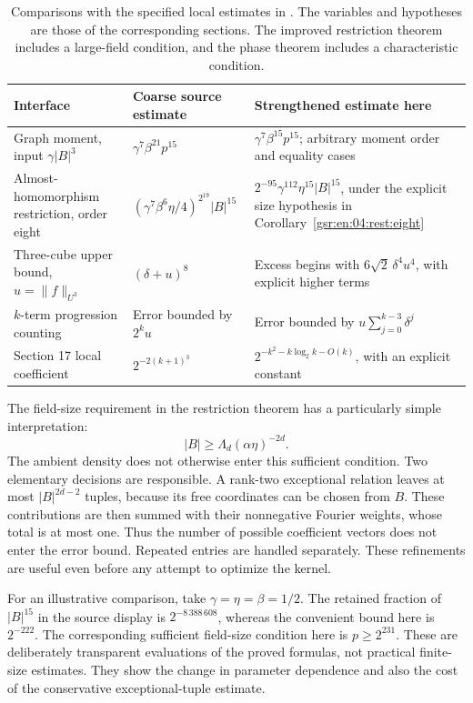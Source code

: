 \documentclass[11pt,letterpaper]{article}
\numberwithin{equation}{section}
\theoremstyle{definition}
\theoremstyle{remark}
\newcommand{\1}{\mathbf 1}
\begin{document}
\begin{table}[htbp]
\centering
\small
\renewcommand{\arraystretch}{1.25}
\begin{tabularx}{\textwidth}{@{}>{\raggedright\arraybackslash}p{}>{\raggedright\arraybackslash}X>{\raggedright\arraybackslash}X@{}}
\toprule
Interface & Coarse source estimate & Strengthened estimate here\\
\midrule
Graph moment, input \(\gamma|B|^3\)
& \(\gamma^7\beta^{21}p^{15}\)
& \(\gamma^7\beta^{15}p^{15}\); arbitrary moment order and equality cases\\
Almost-homomorphism restriction, order eight
& \((\gamma^7\beta^6\eta/4)^{2^{19}}|B|^{15}\)
& \(2^{-95}\gamma^{112}\eta^{15}|B|^{15}\), under the explicit size hypothesis in Corollary~\ref{gsr:en:04:rest:eight}\\
Three-cube upper bound, \(u=\|f\|_{U^3}\)
& \((\delta+u)^8\)
& Excess begins with \(6\sqrt2\,\delta^4u^4\), with explicit higher terms\\
\(k\)-term progression counting
& Error bounded by \(2^k u\)
& Error bounded by \(u\sum_{j=0}^{k-3}\delta^j\)\\
Section 17 local coefficient
& \(2^{-2(k+1)^3}\)
& \(2^{-k^2-k\log_2 k-O(k)}\), with an explicit constant\\
\bottomrule
\end{tabularx}
\caption{Comparisons with the specified local estimates in
\cite{gowers,repo04}.  The variables and hypotheses are those of the
corresponding sections.  The improved restriction theorem includes a
large-field condition, and the phase theorem includes a characteristic
condition.}
\label{gsr:fz:04:tab:comparisons}
\end{table}

The field-size requirement in the restriction theorem has a particularly
simple interpretation:
\[
 |B|\geq \Lambda_d(\alpha\eta)^{-2d}.
\]
The ambient density does not otherwise enter this sufficient condition.
Two elementary decisions are responsible.  A rank-two exceptional relation
leaves at most \(|B|^{2d-2}\) tuples, because its free coordinates can be
chosen from \(B\).  These contributions are then summed with their
nonnegative Fourier weights, whose total is at most one.  Thus the number
of possible coefficient vectors does not enter the error bound.
Repeated entries are handled separately.  These refinements are useful
even before any attempt to optimize the kernel.

For an illustrative comparison, take \(\gamma=\eta=\beta=1/2\).
The retained fraction of \(|B|^{15}\) in the source display is
\(2^{-8\,388\,608}\), whereas the convenient bound here is \(2^{-222}\).
The corresponding sufficient field-size condition here is
\(p\geq2^{231}\).  These are deliberately transparent evaluations of the
proved formulas, not practical finite-size estimates.  They show the
change in parameter dependence and also the cost of the conservative
exceptional-tuple estimate.
\end{document}
